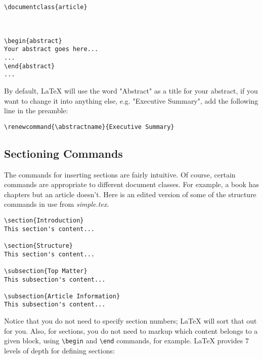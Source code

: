 \begin{lstlisting}
\documentclass{article}



\begin{abstract}
Your abstract goes here...
...
\end{abstract}
...

\end{lstlisting}

By default, LaTeX will use the word "Abstract" as a title for your abstract, if
you want to change it into anything else, e.g. "Executive Summary", add the
following line in the preamble:

\begin{lstlisting}
\renewcommand{\abstractname}{Executive Summary}
\end{lstlisting}


\subsection{ Sectioning Commands }
The commands for inserting sections are fairly intuitive. Of course, certain
commands are appropriate to different document classes. For example, a book has
chapters but an article doesn't. Here is an edited version of some of the
structure commands in use from \textit{simple.tex}.

\begin{lstlisting}
\section{Introduction}
This section's content...

\section{Structure}
This section's content...

\subsection{Top Matter}
This subsection's content...

\subsection{Article Information}
This subsection's content...
\end{lstlisting}


Notice that you do not need to specify section numbers; LaTeX will sort that
out for you. Also, for sections, you do not need to markup which content
belongs to a given block, using \lstinline{\begin} and \lstinline{\end}
commands, for example. LaTeX provides 7 levels of depth for defining sections:

